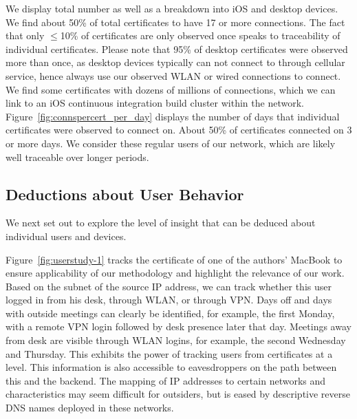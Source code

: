 We display total number as well as a breakdown into iOS and desktop devices. We
find about 50\% of total certificates to have 17 or more connections. The fact
that only $\leq$10\% of certificates are only observed once speaks to
traceability of individual certificates. Please note that 95\% of desktop
certificates were observed more than once, as desktop devices typically can not connect
to {\apns} through cellular service, hence always use our observed WLAN or wired connections to
connect. We find some certificates with dozens of millions of connections, which
we can link to an iOS continuous integration build cluster within the network.
Figure~\ref{fig:connspercert_per_day} displays the number of days that
individual certificates were observed to connect on. About 50\% of certificates
connected on 3 or more days. We consider these regular users of our network,
which are likely well traceable over longer periods.

\subsection{Deductions about User Behavior}
We next set out to explore the level of insight that can be deduced about
individual users and devices.

Figure~\ref{fig:userstudy-1} tracks the {\apns} certificate of one of
the authors' MacBook to ensure applicability of our methodology and
highlight the relevance of our work. Based on the subnet of the source IP address, we can
track whether this user logged in from his desk, through WLAN, or through VPN.
% 
Days off and days with outside meetings can clearly be identified, for example, 
the first Monday, with a remote VPN login followed by desk presence later that day.
Meetings away from desk are visible through WLAN logins, for example, the second
Wednesday and Thursday. 
This exhibits the power of tracking users from \apns certificates at a \man level. 
This information is also accessible to eavesdroppers on the path between this \man and the {\apns} backend. 
The mapping of IP addresses to certain networks and characteristics may seem difficult for outsiders, but is eased by descriptive reverse DNS names deployed in these networks.

